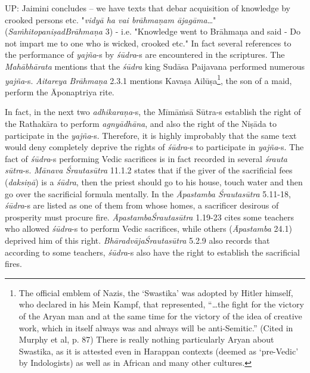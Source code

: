 UP: Jaimini concludes – we have texts that debar acquisition of knowledge by crooked persons etc. "\textit{vidyā ha vai brāhmaṇam ājagāma}…" (\textit{SaṁhitopaniṣadBrāhmaṇa} 3) - i.e. "Knowledge went to Brāhmaṇa and said - Do not impart me to one who is wicked, crooked etc." In fact several references to the performance of \textit{yajña}-s by \textit{śūdra}-s are encountered in the scriptures. The \textit{Mahābhārata} mentions that the \textit{śūdra} king Sudāsa Paijavana performed numerous \textit{yajña}-s. \textit{Aitareya Brāhmaṇa} 2.3.1 mentions Kavaṣa Ailūṣa\footnote{ The official emblem of Nazis, the ‘Swastika’ was adopted by Hitler himself, who declared in his Mein Kampf, that represented, “…the fight for the victory of the Aryan man and at the same time for the victory of the idea of creative work, which in itself always was and always will be anti-Semitic.” (Cited in Murphy et al, p. 87) There is really nothing particularly Aryan about Swastika, as it is attested even in Harappan contexts (deemed as ‘pre-Vedic’ by Indologists) as well as in African and many other cultures.}, the son of a maid, perform the Āponaptriya rite.

In fact, in the next two \textit{adhikaraṇa}-s, the Mīmāṁsā Sūtra-s establish the right of the Rathakāra to perform \textit{agnyādhāna}, and also the right of the Niṣāda to participate in the \textit{yajña}-s. Therefore, it is highly improbably that the same text would deny completely deprive the rights of \textit{śūdra}-s to participate in \textit{yajña}-s. The fact of \textit{śūdra}-s performing Vedic sacrifices is in fact recorded in several \textit{śrauta sūtra}-s. \textit{Mānava Śrautasūtra} 11.1.2 states that if the giver of the sacrificial fees (\textit{daksiṇā}) is a \textit{śūdra}, then the priest should go to his house, touch water and then go over the sacrificial formula mentally. In the \textit{Āpastamba Śrautasūtra} 5.11-18, \textit{śūdra}-s are listed as one of them from whose homes, a sacrificer desirous of prosperity must procure fire. \textit{ĀpastambaŚrautasūtra} 1.19-23 cites some teachers who allowed \textit{śūdra}-s to perform Vedic sacrifices, while others (\textit{Āpastamba} 24.1) deprived him of this right. \textit{BhāradvājaŚrautasūtra} 5.2.9 also records that according to some teachers, \textit{śūdra}-s also have the right to establish the sacrificial fires.

